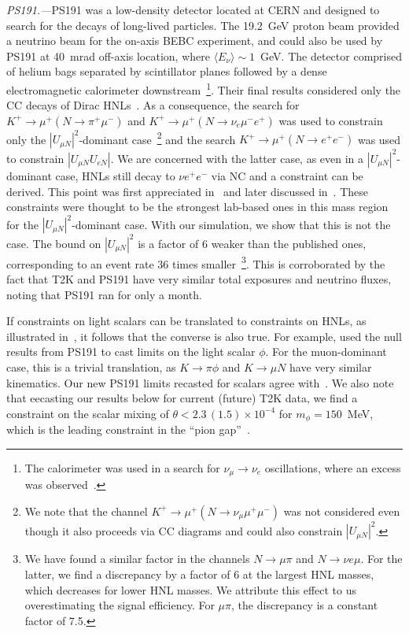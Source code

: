 \documentclass[
reprint,
superscriptaddress,
showpacs,
preprintnumbers,
bibnotes,
amsmath,
amssymb,
aps,
prd,
floatfix
]{revtex4-2}
\begin{document}
\emph{PS191.---}PS191 was a low-density detector located at CERN and designed to search for the decays of long-lived particles. 
The 19.2~GeV proton beam provided a neutrino beam for the on-axis BEBC experiment, and could also be used by PS191 at 40~mrad off-axis location, where $\langle E_\nu \rangle\sim 1$~GeV.
The detector comprised of helium bags separated by scintillator planes followed by a dense electromagnetic calorimeter downstream~\footnote{The calorimeter was used in a search for $\nu_\mu \to \nu_e$ oscillations, where an excess was observed~\cite{Bernardi:1986hs}.}. 
Their final results considered only the CC decays of Dirac HNLs~\cite{Levy:1986yx,Bernardi:1987ek}.
As a consequence, the search for $K^+\to\mu^+ (N \to \pi^+\mu^-)$ and $K^+\to \mu^+ (N\to \nu_e \mu^- e^+)$ was used to constrain only the $|U_{\mu N}|^2$-dominant case~\footnote{We note that the channel $K^+ \to \mu^+ (N \to \nu_\mu \mu^+ \mu^-)$ was not considered even though it also proceeds via CC diagrams and could also constrain $|U_{\mu N}|^2$.} and the search $K^+\to\mu^+ (N \to e^+e^-)$ was used to constrain $|U_{\mu N} U_{e N}|$. 
We are concerned with the latter case, as even in a $|U_{\mu N}|^2$-dominant case, HNLs still decay to $\nu e^+e^-$ via NC and a constraint can be derived. 
This point was first appreciated in~\cite{Kusenko:2004qc} and later discussed in~\cite{Ruchayskiy:2011aa,Drewes:2015iva}. 
These constraints were thought to be the strongest lab-based ones in this mass region for the $|U_{\mu N}|^2$-dominant case. 
With our simulation, we show that this is not the case.
The bound on $|U_{\mu N}|^2$ is a factor of 6 weaker than the published ones, corresponding to an event rate 36 times smaller~\footnote{We have found a similar factor in the channels $N\to \mu \pi$ and $N\to \nu e \mu$. For the latter, we find a discrepancy by a factor of 6 at the largest HNL masses, which decreases for lower HNL masses. We attribute this effect to us overestimating the signal efficiency. For $\mu\pi$, the discrepancy is a constant factor of 7.5.}. 
This is corroborated by the fact that T2K and PS191 have very similar total exposures and neutrino fluxes, noting that PS191 ran for only a month.

If constraints on light scalars can be translated to constraints on HNLs, as illustrated in~\cite{Kelly:2021xbv}, it follows that the converse is also true. For example, \cite{Gorbunov:2021ccu} used the null results from PS191 to cast limits on the light scalar $\phi$. 
For the muon-dominant case, this is a trivial translation, as $K\to \pi \phi$ and $K\to \mu N$ have very similar kinematics. 
Our new PS191 limits recasted for scalars agree with~\cite{Gorbunov:2021ccu}. 
We also note that eecasting our results below for current (future) T2K data, we find a constraint on the scalar mixing of $\theta< 2.3 \, (1.5) \times 10^{-4}$ for $m_\phi = 150$~MeV, which is the leading constraint in the ``pion gap''~\cite{Fuyuto:2014cya}.
\end{document}
